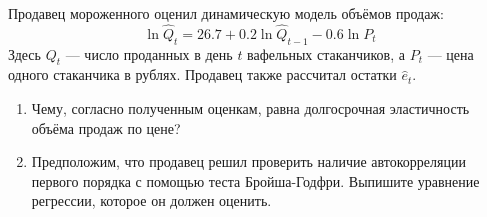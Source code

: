 \begin{problem}
Продавец мороженного оценил динамическую модель объёмов продаж:
\[
\ln \hat{Q}_t=26.7 + 0.2\ln \hat{Q}_{t-1}-0.6\ln P_t
\]
Здесь $Q_t$ — число проданных в день $t$ вафельных стаканчиков, а $P_t$ — цена одного стаканчика в рублях. Продавец также рассчитал остатки $\hat{e}_t$.
\begin{enumerate}
\item Чему, согласно полученным оценкам, равна долгосрочная эластичность объёма продаж по цене?
\item Предположим, что продавец решил проверить наличие автокорреляции первого порядка с помощью теста Бройша-Годфри. Выпишите уравнение регрессии, которое он должен оценить.
\end{enumerate}


\begin{sol}
\end{sol}
\end{problem}


